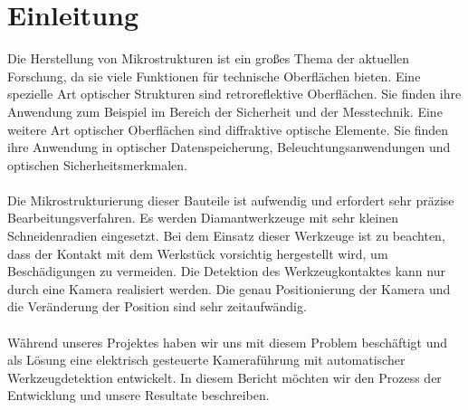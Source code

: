 \documentclass[12pt,a4paper,bibliography=totocnumbered,listof=totocnumbered]{scrartcl}
\begin{document}
\onehalfspacing
\renewcommand{\thesection}{\arabic{section}}
\renewcommand{\theHsection}{\arabic{section}}
\setcounter{section}{0}
\setcounter{page}{1}

\section{Einleitung}
Die Herstellung von Mikrostrukturen ist ein großes Thema der aktuellen Forschung, da sie viele Funktionen für technische Oberflächen bieten. Eine spezielle Art optischer Strukturen sind retroreflektive Oberflächen. Sie finden ihre Anwendung zum Beispiel im Bereich der Sicherheit und der Messtechnik. Eine weitere Art optischer Oberflächen sind diffraktive optische Elemente. Sie finden ihre Anwendung in optischer Datenspeicherung, Beleuchtungsanwendungen und optischen Sicherheitsmerkmalen. \\ \\
Die Mikrostrukturierung dieser Bauteile ist aufwendig und erfordert sehr präzise Bearbeitungsverfahren. Es werden Diamantwerkzeuge mit sehr kleinen Schneidenradien eingesetzt. Bei dem Einsatz dieser Werkzeuge ist zu beachten, dass der Kontakt mit dem Werkstück vorsichtig hergestellt wird, um Beschädigungen zu vermeiden. Die Detektion des Werkzeugkontaktes kann nur durch eine Kamera realisiert werden. Die genau Positionierung der Kamera und die Veränderung der Position sind sehr zeitaufwändig. \\ \\
Während unseres Projektes haben wir uns mit diesem Problem beschäftigt und als Lösung eine elektrisch gesteuerte Kameraführung mit automatischer Werkzeugdetektion entwickelt. In diesem Bericht möchten wir den Prozess der Entwicklung und unsere Resultate beschreiben. 
\end{document}
